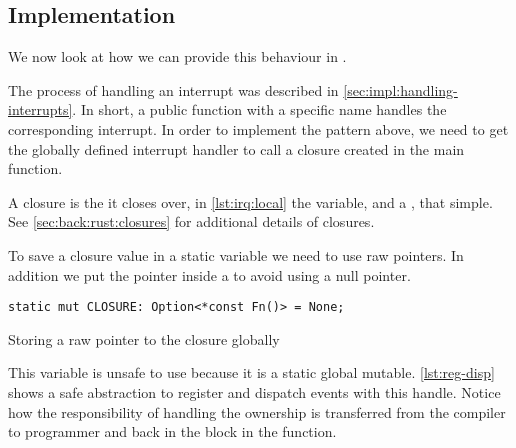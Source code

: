 \subsection{Implementation}
We now look at how we can provide this behaviour in {\rust}.

The process of handling an interrupt was described in \autoref{sec:impl:handling-interrupts}.
In short, a public function with a specific name handles the corresponding interrupt.
In order to implement the pattern above, we need to get the globally defined interrupt handler  to call a closure created in the main function.

A closure is the  it closes over, in \autoref{lst:irq:local} the  variable, and a , that simple.
See \autoref{sec:back:rust:closures} for additional details of closures.

To save a closure value in a static variable we need to use raw pointers.
In addition we put the pointer inside a  to avoid using a null pointer.

\begin{listing}[H]
  \begin{verbatim}
static mut CLOSURE: Option<*const Fn()> = None;
  \end{verbatim}
  \caption{Storing a raw pointer to the closure globally}
  \label{lst:raw-global-pointer-to-closure}
\end{listing}

This variable is unsafe to use because it is a static global mutable.
\autoref{lst:reg-disp} shows a safe abstraction to register and dispatch events with this handle.
Notice how the responsibility of handling the ownership is transferred from the compiler to programmer and back in the {\unsafe} block in the  function.

